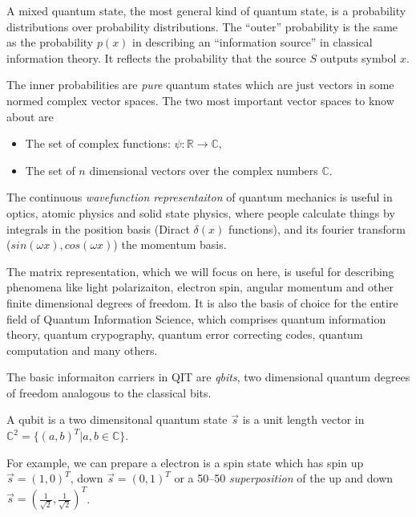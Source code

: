 \documentclass[aps,11pt,twoside,letterpaper]{article}
\def\c{\mathbb{C}}
\begin{document}
        A mixed quantum state, the most general kind of quantum state, is a
        probability distributions over probability distributions.
        The ``outer'' probability is the same as the probability $p(x)$ in describing 
        an ``information source'' in classical information theory.
        It reflects the probability that the source $S$ outputs symbol $x$.

        The inner probabilities are \emph{pure} quantum states 
        which are just vectors in some normed complex vector spaces.
        The two most important vector spaces to know about are  
        \begin{itemize}
            \item   The set of complex functions: $\psi \colon \mathbb{R} \to \mathbb{C} $,
            \item   The set of $n$ dimensional vectors over the complex numbers $\c$.
        \end{itemize}
        The continuous \emph{wavefunction representaiton} of quantum mechanics is useful in optics,
        atomic physics and solid state physics, where people calculate things by integrals in 
        the position basis (Diract $\delta(x)$ functions),
        and its fourier transform ($sin(\omega x),cos(\omega x)$) the momentum basis.

        The matrix representation, which we will focus on here,  is useful for describing 
        phenomena like light polarizaiton, electron spin, angular momentum and other 
        finite dimensional degrees of freedom.
        It is also the basis of choice for the entire field of Quantum Information Science,
        which comprises quantum information theory, quantum crypography, quantum error correcting codes, 
        quantum computation and many others.

        The basic informaiton carriers in QIT are \emph{qbits}, two dimensional quantum degrees
        of freedom analogous to the classical bits. 

        \begin{definition}[qubit]
            A qubit is a two dimensitonal quantum state $\vec{s}$ is a 
            unit length vector in $\c^2 = \{(a,b)^T| a,b \in \c\}$.
        \end{definition}

        For example, we can prepare a electron is a spin state which has spin up $\vec{s}=(1,0)^T$,
        down $\vec{s}=(0,1)^T$ or a 50--50 \emph{superposition} of the up and down $\vec{s} = (\frac{1}{\sqrt{2}}, \frac{1}{\sqrt{2}})^T$.
\end{document}
